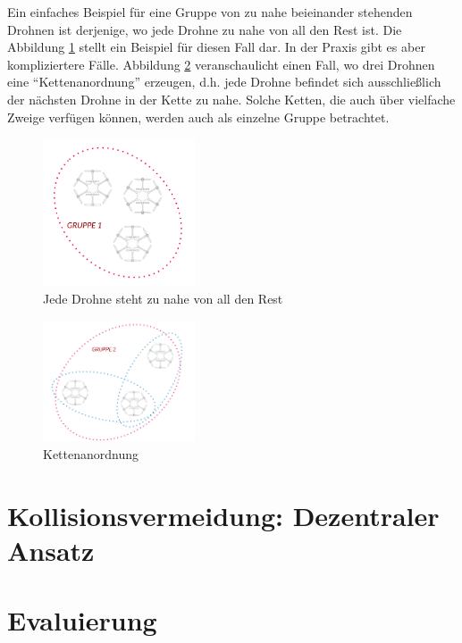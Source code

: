 \documentclass[a4paper,titlepage,onecolumn,twoside,12pt]{article}
\begin{document}
Ein einfaches Beispiel für eine Gruppe von zu nahe beieinander stehenden Drohnen ist derjenige, wo jede Drohne zu nahe von all den Rest ist. Die Abbildung \ref{fig:gruppenerkennung_beispiele1} stellt ein Beispiel für diesen Fall dar. In der Praxis gibt es aber kompliziertere Fälle. Abbildung \ref{fig:gruppenerkennung_beispiele2} veranschaulicht einen Fall, wo drei Drohnen eine "`Kettenanordnung"' erzeugen, d.h. jede Drohne befindet sich ausschließlich der nächsten Drohne in der Kette zu nahe. Solche Ketten, die auch über vielfache Zweige verfügen können, werden auch als einzelne Gruppe betrachtet.



\begin{figure}
\centering
\includegraphics[width = 0.4\textwidth]{Gruppenerkennung_beispiele1}
\caption{Jede Drohne steht zu nahe von all den Rest}
\label{fig:gruppenerkennung_beispiele1}
\end{figure}

\begin{figure}
\centering
\includegraphics[width = 0.4\textwidth]{Gruppenerkennung_beispiele2}
\caption{Kettenanordnung}
\label{fig:gruppenerkennung_beispiele2}
\end{figure}

\section{Kollisionsvermeidung: Dezentraler Ansatz}
\label{sec:dezentral}
\section{Evaluierung}
\label{sec:evaluierung}
\end{document}
